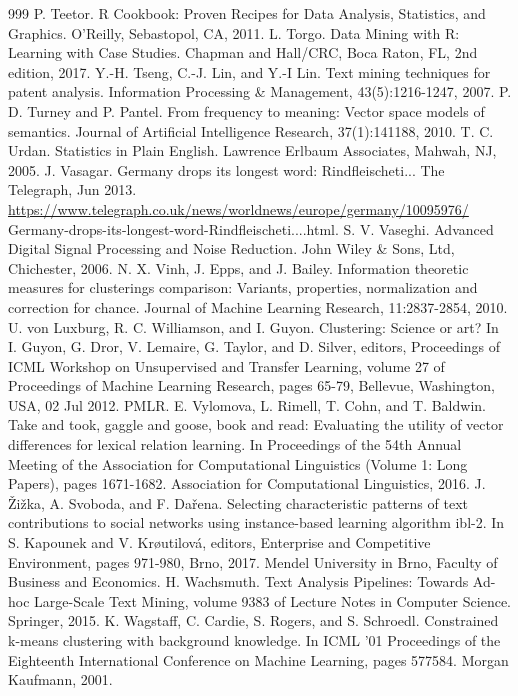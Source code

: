 \documentclass[11pt,openany,executivepaper]{book}
\begin{document}
\begin{thebibliography}{999}
 P. Teetor. R Cookbook: Proven Recipes for Data Analysis, Statistics, and Graphics. O'Reilly, Sebastopol, CA, 2011.
 L. Torgo. Data Mining with R: Learning with Case Studies. Chapman and Hall/CRC, Boca Raton, FL, 2nd edition, 2017.
 Y.-H. Tseng, C.-J. Lin, and Y.-I Lin. Text mining techniques for patent analysis. Information Processing \& Management, 43(5):1216-1247, 2007.
 P. D. Turney and P. Pantel. From frequency to meaning: Vector space models of semantics. Journal of Artificial Intelligence Research, 37(1):141188, 2010.
 T. C. Urdan. Statistics in Plain English. Lawrence Erlbaum Associates, Mahwah, NJ, 2005.
 J. Vasagar. Germany drops its longest word: Rindfleischeti... The Telegraph, Jun 2013. \url{https://www.telegraph.co.uk/news/worldnews/europe/germany/10095976/} Germany-drops-its-longest-word-Rindfleischeti....html.
 S. V. Vaseghi. Advanced Digital Signal Processing and Noise Reduction. John Wiley \& Sons, Ltd, Chichester, 2006.
 N. X. Vinh, J. Epps, and J. Bailey. Information theoretic measures for clusterings comparison: Variants, properties, normalization and correction for chance. Journal of Machine Learning Research, 11:2837-2854, 2010.
 U. von Luxburg, R. C. Williamson, and I. Guyon. Clustering: Science or art? In I. Guyon, G. Dror, V. Lemaire, G. Taylor, and D. Silver, editors, Proceedings of ICML Workshop on Unsupervised and Transfer Learning, volume 27 of Proceedings of Machine Learning Research, pages 65-79, Bellevue, Washington, USA, 02 Jul 2012. PMLR.
 E. Vylomova, L. Rimell, T. Cohn, and T. Baldwin. Take and took, gaggle and goose, book and read: Evaluating the utility of vector differences for lexical relation learning. In Proceedings of the 54th Annual Meeting of the Association for Computational Linguistics (Volume 1: Long Papers), pages 1671-1682. Association for Computational Linguistics, 2016.
 J. Žižka, A. Svoboda, and F. Dařena. Selecting characteristic patterns of text contributions to social networks using instance-based learning algorithm ibl-2. In S. Kapounek and V. Krøutilová, editors, Enterprise and Competitive Environment, pages 971-980, Brno, 2017. Mendel University in Brno, Faculty of Business and Economics.
 H. Wachsmuth. Text Analysis Pipelines: Towards Ad-hoc Large-Scale Text Mining, volume 9383 of Lecture Notes in Computer Science. Springer, 2015.
 K. Wagstaff, C. Cardie, S. Rogers, and S. Schroedl. Constrained k-means clustering with background knowledge. In ICML '01 Proceedings of the Eighteenth International Conference on Machine Learning, pages 577584. Morgan Kaufmann, 2001.

\end{thebibliography}
\end{document}
